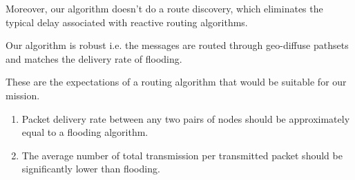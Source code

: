 Moreover, our algorithm doesn't do a route discovery, which eliminates the typical delay associated with reactive routing algorithms. 

Our algorithm is robust i.e. the messages are routed through geo-diffuse pathsets and matches the delivery rate of flooding.

These are the expectations of a routing algorithm that would be suitable for our mission. 
\begin{enumerate}
\item Packet delivery rate between any two pairs of nodes should be approximately equal to a flooding algorithm. 
\item The average number of total transmission per transmitted packet should be significantly lower than flooding.
\end{enumerate}
